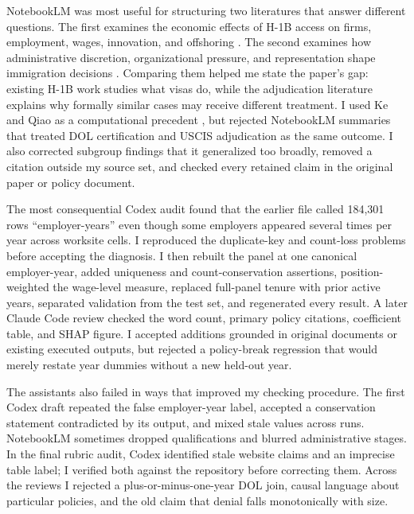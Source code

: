 \documentclass[9pt,twoside]{pnas-new}
\begin{document}
NotebookLM was most useful for structuring two literatures that answer different questions. The first examines the economic effects of H-1B access on firms, employment, wages, innovation, and offshoring \cite{doran2022,mahajan2025,peri2015,glennon2024,mayda2020,borjas2026,bourveau2025}. The second examines how administrative discretion, organizational pressure, and representation shape immigration decisions \cite{lipsky1980,ramjinogales2007,brodkin2011,eaglyshafer2015}. Comparing them helped me state the paper's gap: existing H-1B work studies what visas do, while the adjudication literature explains why formally similar cases may receive different treatment. I used Ke and Qiao as a computational precedent \cite{keqiao2021}, but rejected NotebookLM summaries that treated DOL certification and USCIS adjudication as the same outcome. I also corrected subgroup findings that it generalized too broadly, removed a citation outside my source set, and checked every retained claim in the original paper or policy document.

The most consequential Codex audit found that the earlier file called 184,301 rows ``employer-years'' even though some employers appeared several times per year across worksite cells. I reproduced the duplicate-key and count-loss problems before accepting the diagnosis. I then rebuilt the panel at one canonical employer-year, added uniqueness and count-conservation assertions, position-weighted the wage-level measure, replaced full-panel tenure with prior active years, separated validation from the test set, and regenerated every result. A later Claude Code review checked the word count, primary policy citations, coefficient table, and SHAP figure. I accepted additions grounded in original documents or existing executed outputs, but rejected a policy-break regression that would merely restate year dummies without a new held-out year.

The assistants also failed in ways that improved my checking procedure. The first Codex draft repeated the false employer-year label, accepted a conservation statement contradicted by its output, and mixed stale values across runs. NotebookLM sometimes dropped qualifications and blurred administrative stages. In the final rubric audit, Codex identified stale website claims and an imprecise table label; I verified both against the repository before correcting them. Across the reviews I rejected a plus-or-minus-one-year DOL join, causal language about particular policies, and the old claim that denial falls monotonically with size.
\end{document}
